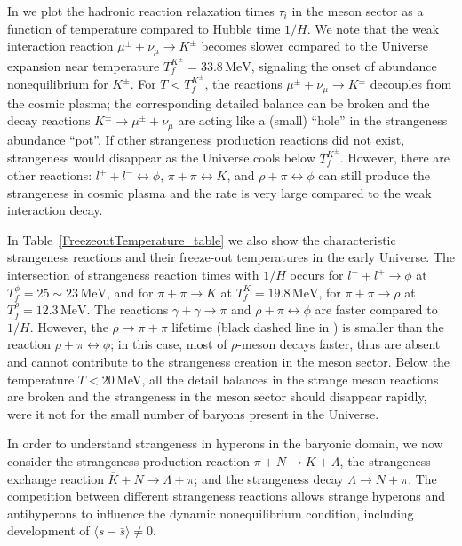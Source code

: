 In  we plot the  hadronic reaction relaxation times $\tau_{i}$ in the meson sector as a function of temperature compared to Hubble time $1/H$. We note that the weak interaction reaction $\mu^\pm+\nu_{\mu}\rightarrow K^\pm$ becomes slower compared to the Universe expansion near temperature $T_f^{K^\pm}=33.8\,\mathrm{MeV}$, signaling the onset of abundance nonequilibrium for $K^\pm$. For $T<T_f^{K^\pm}$, the reactions $\mu^\pm+\nu_{\mu}\rightarrow K^\pm$ decouples from the cosmic plasma; the corresponding detailed balance can be broken and the decay reactions $K^\pm\rightarrow\mu^\pm+\nu_{\mu}$ are acting like a (small) ``hole'' in the strangeness abundance ``pot''. If other strangeness production reactions did not exist, strangeness would disappear as the Universe cools below $T_f^{K^\pm}$.  However, there are other reactions: $l^++l^-\leftrightarrow\phi$, $\pi+\pi\leftrightarrow K$, and $\rho+\pi\leftrightarrow\phi$ can still produce the strangeness in cosmic plasma and the rate is very large compared to the weak interaction decay.


In Table~\ref{FreezeoutTemperature_table} we also show the characteristic strangeness reactions and their freeze-out temperatures in the early Universe. The intersection of strangeness reaction times with $1/H$ occurs for $l^-+l^+\rightarrow\phi$ at $T_f^\phi=25\sim23\,\mathrm{MeV}$, and for $\pi+\pi\rightarrow K$ at $T_f^K=19.8\,\mathrm{MeV}$, for $\pi+\pi\rightarrow\rho$ at $T_f^\rho=12.3\,\mathrm{MeV}$. The reactions $\gamma+\gamma\rightarrow\pi$ and $\rho+\pi\leftrightarrow\phi$ are faster compared to $1/H$. However, the $\rho\to\pi+\pi$ lifetime (black dashed line in ) is smaller than the reaction $\rho+\pi\leftrightarrow\phi$; in this case, most of $\rho$-meson decays faster, thus are absent and cannot contribute to the strangeness creation in the meson sector. Below the temperature $T<20$\,MeV, all the detail balances in the strange meson reactions are broken and the strangeness in the meson sector should disappear rapidly, were it not for the small number of baryons present in the Universe.

In order to understand strangeness in hyperons in the baryonic domain, we now consider the strangeness production reaction $\pi +N\rightarrow K+\Lambda$, the strangeness exchange reaction $\overline{K}+N\rightarrow \Lambda+\pi$; and the strangeness decay $\Lambda\rightarrow N+\pi$. The competition between different strangeness reactions allows strange hyperons and antihyperons to influence the dynamic nonequilibrium condition, including development of $\langle s-\bar s\rangle \ne 0$. %

